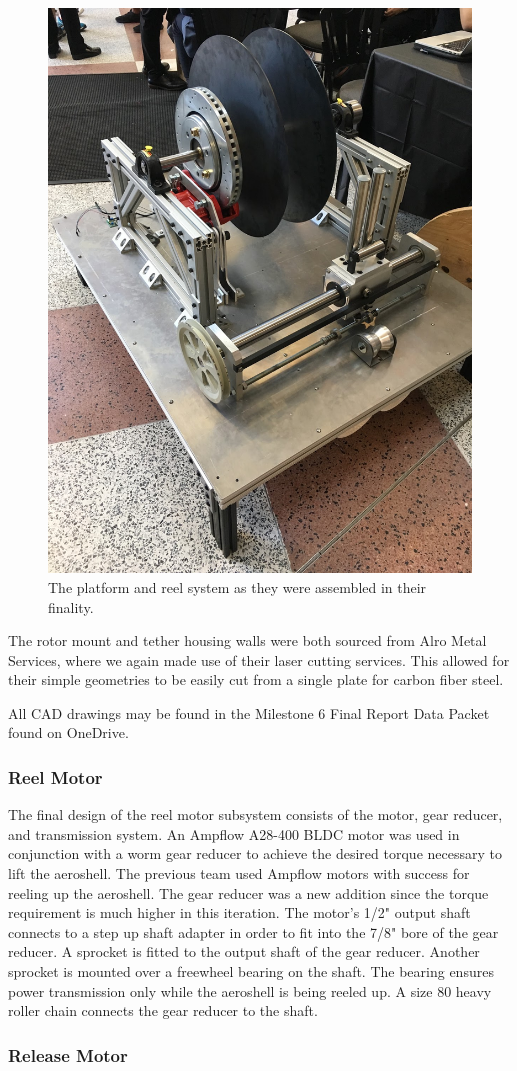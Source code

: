 \begin{figure}[ht]
  \centering
  \includegraphics[width=.4\textwidth]{TUMBR/RealUnitReel.jpg}
  \caption{\label{fig:RealUnitReel}The platform and reel system as they were assembled in their finality.}
\end{figure}

The rotor mount and tether housing walls were both sourced from Alro Metal Services, where we again made use of their laser cutting services. This allowed for their simple geometries to be easily cut from a single plate for carbon fiber steel. 

All CAD drawings may be found in the Milestone 6 Final Report Data Packet found on OneDrive. 

\subsubsection{Reel Motor}

The final design of the reel motor subsystem consists of the motor, gear reducer, and transmission system. An Ampflow A28-400 BLDC motor was used in conjunction with a worm gear reducer to achieve the desired torque necessary to lift the aeroshell. The previous team used Ampflow motors with success for reeling up the aeroshell. The gear reducer was a new addition since the torque requirement is much higher in this iteration. The motor's 1/2" output shaft connects to a step up shaft adapter in order to fit into the 7/8" bore of the gear reducer. A sprocket is fitted to the output shaft of the gear reducer. Another sprocket is mounted over a freewheel bearing on the shaft. The bearing ensures power transmission only while the aeroshell is being reeled up. A size 80 heavy roller chain connects the gear reducer to the shaft.

\subsubsection{Release Motor}

